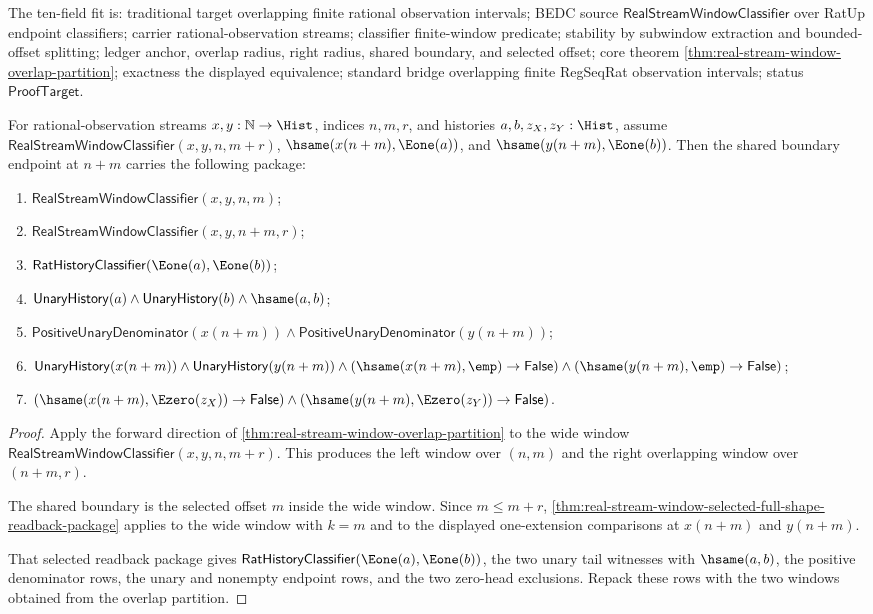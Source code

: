 The ten-field fit is: traditional target overlapping finite rational
observation intervals; BEDC source $\mathsf{RealStreamWindowClassifier}$ over
RatUp endpoint classifiers; carrier rational-observation streams; classifier
finite-window predicate; stability by subwindow extraction and bounded-offset
splitting; ledger anchor, overlap radius, right radius, shared boundary, and
selected offset; core theorem
\autoref{thm:real-stream-window-overlap-partition}; exactness the displayed
equivalence; standard bridge overlapping finite RegSeqRat observation
intervals; status $\mathsf{ProofTarget}$.

\begin{theorem}
\label{thm:real-stream-window-overlap-boundary-readback-package}
For rational-observation streams $x,y:\mathbb{N}\to\Hist$, indices $n,m,r$,
and histories $a,b,z_X,z_Y:\Hist$, assume
$\mathsf{RealStreamWindowClassifier}(x,y,n,m+r)$,
$\hsame(x(n+m),\Eone(a))$, and $\hsame(y(n+m),\Eone(b))$. Then the shared
boundary endpoint at $n+m$ carries the following package:
\begin{enumerate}
\item $\mathsf{RealStreamWindowClassifier}(x,y,n,m)$;
\item $\mathsf{RealStreamWindowClassifier}(x,y,n+m,r)$;
\item $\mathsf{RatHistoryClassifier}(\Eone(a),\Eone(b))$;
\item $\mathsf{UnaryHistory}(a)\land \mathsf{UnaryHistory}(b)\land
\hsame(a,b)$;
\item $\mathsf{PositiveUnaryDenominator}(x(n+m))\land
\mathsf{PositiveUnaryDenominator}(y(n+m))$;
\item $\mathsf{UnaryHistory}(x(n+m))\land
\mathsf{UnaryHistory}(y(n+m))\land
(\hsame(x(n+m),\emp)\to\mathsf{False})\land
(\hsame(y(n+m),\emp)\to\mathsf{False})$;
\item $(\hsame(x(n+m),\Ezero(z_X))\to\mathsf{False})\land
(\hsame(y(n+m),\Ezero(z_Y))\to\mathsf{False})$.
\end{enumerate}
\end{theorem}
\begin{proof}
Apply the forward direction of
\autoref{thm:real-stream-window-overlap-partition} to the wide window
$\mathsf{RealStreamWindowClassifier}(x,y,n,m+r)$. This produces the left
window over $(n,m)$ and the right overlapping window over $(n+m,r)$.

The shared boundary is the selected offset $m$ inside the wide window. Since
$m\le m+r$, \autoref{thm:real-stream-window-selected-full-shape-readback-package}
applies to the wide window with $k=m$ and to the displayed one-extension
comparisons at $x(n+m)$ and $y(n+m)$.

That selected readback package gives
$\mathsf{RatHistoryClassifier}(\Eone(a),\Eone(b))$, the two unary tail
witnesses with $\hsame(a,b)$, the positive denominator rows, the unary and
nonempty endpoint rows, and the two zero-head exclusions. Repack these rows
with the two windows obtained from the overlap partition.
\end{proof}

